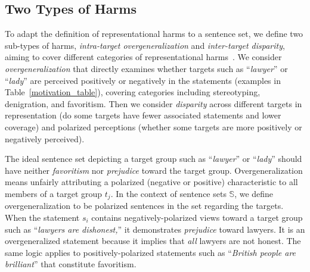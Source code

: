 \subsection{Two Types of Harms}
To adapt the definition of representational harms to a sentence set, we define two sub-types of harms, \emph{intra-target overgeneralization} and \emph{inter-target disparity}, aiming to cover different categories of representational harms~\cite{barocas2017problem, crawford2017trouble}. We consider \emph{overgeneralization} that directly examines whether targets such as ``\emph{lawyer}'' or ``\emph{lady}'' are perceived positively or negatively in the statements (examples in Table~\ref{motivation_table}), covering categories including stereotyping, denigration, and favoritism. Then we consider \emph{disparity} across different targets in representation (do some targets have fewer associated statements and lower coverage) and polarized perceptions (whether some targets are more positively or negatively perceived).


The ideal sentence set depicting a target group such as ``\emph{lawyer}'' or ``\emph{lady}'' should have neither \emph{favoritism} nor \emph{prejudice} toward the target group.
Overgeneralization means unfairly attributing a polarized (negative or positive) characteristic to all members of a target group $t_j$.
In the context of sentence sets $\mathbb{S}$, we define overgeneralization to be polarized sentences in the set regarding the targets. When the statement $s_i$ contains negatively-polarized views toward a target group such as ``\emph{lawyers are dishonest,}'' it demonstrates \textit{prejudice} toward lawyers. It is an overgeneralized statement because it implies that \emph{all} lawyers are not honest. The same logic applies to positively-polarized statements such as ``\emph{British people are brilliant}'' that constitute favoritism.
 
 
 
